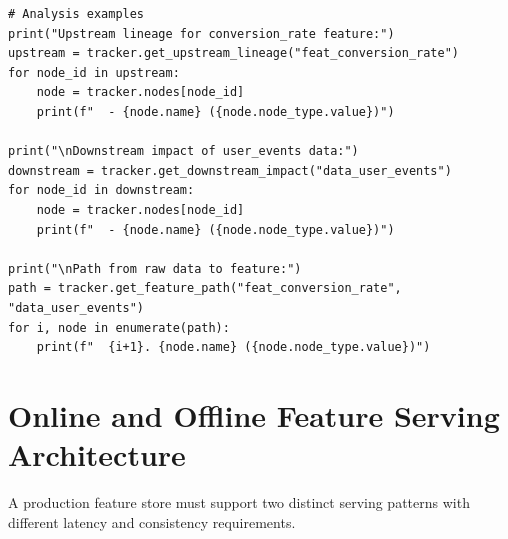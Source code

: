 \begin{lstlisting}[style=python, caption=End-to-end feature lineage tracking system]
# Analysis examples
print("Upstream lineage for conversion_rate feature:")
upstream = tracker.get_upstream_lineage("feat_conversion_rate")
for node_id in upstream:
    node = tracker.nodes[node_id]
    print(f"  - {node.name} ({node.node_type.value})")

print("\nDownstream impact of user_events data:")
downstream = tracker.get_downstream_impact("data_user_events")
for node_id in downstream:
    node = tracker.nodes[node_id]
    print(f"  - {node.name} ({node.node_type.value})")

print("\nPath from raw data to feature:")
path = tracker.get_feature_path("feat_conversion_rate", "data_user_events")
for i, node in enumerate(path):
    print(f"  {i+1}. {node.name} ({node.node_type.value})")
\end{lstlisting}

\section{Online and Offline Feature Serving Architecture}

A production feature store must support two distinct serving patterns with different latency and consistency requirements.

